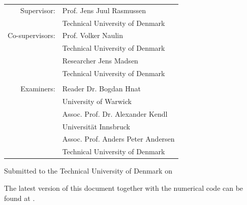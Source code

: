 \begin{titlepage}
\begin{center}
        \large
        {\def\arraystretch{1}\tabcolsep=10pt
        \begin{tabular}{rl}
        Supervisor:     & Prof. Jens Juul Rasmussen          \\ & Technical University of Denmark\\
        Co-supervisors: & Prof. Volker Naulin                \\ & Technical University of Denmark\\
                        & Researcher Jens Madsen             \\ & Technical University of Denmark\\
        &\\
        Examiners:      & Reader Dr.  Bogdan Hnat            \\ & University of Warwick\\
                        & Assoc. Prof. Dr.  Alexander Kendl  \\ & Universit{\"a}t Innsbruck\\
                        & Assoc. Prof. Anders Peter Andersen \\ & Technical University of Denmark\\
        \end{tabular}
        }

        \vfill

        Submitted to the Technical University of Denmark on \thesisDate

        \vfill
        The latest version of this document together with the numerical code can be found at \celmaProject.
    \end{center}
\end{titlepage}
